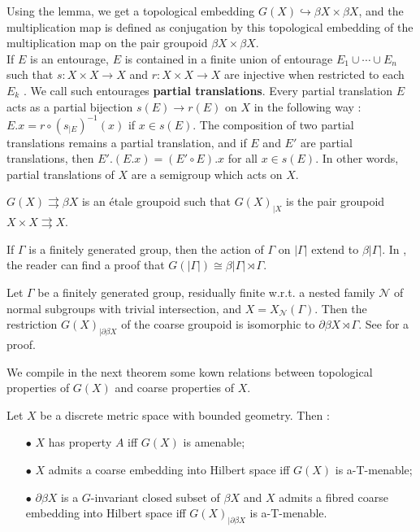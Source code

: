 Using the lemma, we get a topological embedding $G(X)\hookrightarrow \beta X\times \beta X$, and the multiplication map is defined as conjugation by this topological embedding of the multiplication map on the pair groupoid $\beta X\times \beta X$.\\

If $E$ is an entourage, $E$ is contained in a finite union of entourage $E_1\cup \cdots \cup E_n$ such that $s: X\times X \rightarrow X$ and $r: X\times X \rightarrow X$ are injective when restricted to each $E_k$ \cite{RoeCoarse}. We call such entourages \textbf{partial translations}. Every partial translation $E$ acts as a partial bijection $s(E)\rightarrow r(E)$ on $X$ in the following way : $E.x = r\circ (s_{|E})^{-1}(x)$ if $x\in s(E)$. The composition of two partial translations remains a partial translation, and if $E$ and $E'$ are partial translations, then $E'.(E.x) = (E'\circ E).x$ for all $x\in s(E)$. In other words, partial translations of $X$ are a semigroup which acts on $X$.

\begin{prop}\cite{SkTuYu} $G(X)\rightrightarrows \beta X$ is an étale groupoid such that $G(X)_{|X}$ is the pair groupoid $X\times X\rightrightarrows X$.  
\end{prop}

\begin{Expl} If $\Gamma$ is a finitely generated group, then the action of $\Gamma$ on $|\Gamma|$ extend to $\beta | \Gamma |$. In \cite{SkTuYu}, the reader can find a proof that $G( | \Gamma | )\cong \beta | \Gamma | \rtimes \Gamma $.
\end{Expl}

\begin{Expl} Let $\Gamma$ be a finitely generated group, residually finite w.r.t. a nested family $\mathcal N$ of normal subgroups with trivial intersection, and $X=X_{\mathcal N}(\Gamma)$. Then the restriction $G(X)_{|\partial \beta X}$ of the coarse groupoid is isomorphic to $\partial \beta X\rtimes \Gamma$. See \cite{FinnCoarse} for a proof.
\end{Expl}

We compile in the next theorem some kown relations between topological properties of $G(X)$ and coarse properties of $X$.

\begin{thm}
Let $X$ be a discrete metric space with bounded geometry. Then :
\begin{itemize}
\item[$\bullet$] $X$ has property $A$ iff $G(X)$ is amenable; \cite{SkTuYu}
\item[$\bullet$] $X$ admits a coarse embedding into Hilbert space iff $G(X)$ is a-T-menable; \cite{SkTuYu}
\item[$\bullet$] $\partial \beta X$ is a $G$-invariant closed subset of $\beta X$ and $X$ admits a fibred coarse embedding into Hilbert space iff $G(X)_{|\partial\beta X}$ is a-T-menable. \cite{FinnSellFibred}
\end{itemize}
\end{thm}

